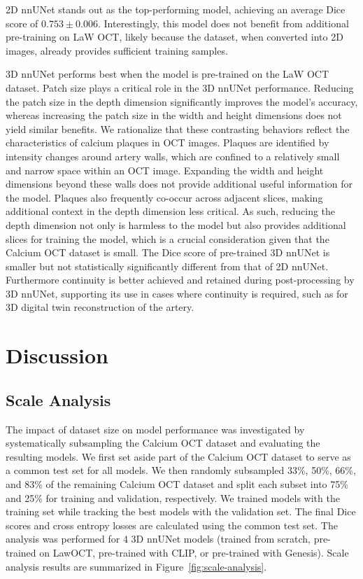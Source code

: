\documentclass[a4paper,11pt,oneside]{report}
\begin{document}
2D nnUNet stands out as the top-performing model, achieving an average Dice score of $0.753 \pm 0.006$. Interestingly, this model does not benefit from additional pre-training on LaW OCT, likely because the dataset, when converted into 2D images, already provides sufficient training samples.

3D nnUNet performs best when the model is pre-trained on the LaW OCT dataset. Patch size plays a critical role in the 3D nnUNet performance. Reducing the patch size in the depth dimension significantly improves the model’s accuracy, whereas increasing the patch size in the width and height dimensions does not yield similar benefits. We rationalize that these contrasting behaviors reflect the characteristics of calcium plaques in OCT images. Plaques are identified by intensity changes around artery walls, which are confined to a relatively small and narrow space within an OCT image. Expanding the width and height dimensions beyond these walls does not provide additional useful information for the model. Plaques also frequently co-occur across adjacent slices, making additional context in the depth dimension less critical. As such, reducing the depth dimension not only is harmless to the model but also provides additional slices for training the model, which is a crucial consideration given that the Calcium OCT dataset is small. The Dice score of pre-trained 3D nnUNet is smaller but not statistically significantly different from that of 2D nnUNet. Furthermore continuity is better achieved and retained during post-processing by 3D nnUNet, supporting its use in cases where continuity is required, such as for 3D digital twin reconstruction of the artery. %

\section{Discussion}
\subsection{Scale Analysis}
The impact of dataset size on model performance was investigated by systematically subsampling the Calcium OCT dataset and evaluating the resulting models. We first set aside part of the Calcium OCT dataset to serve as a common test set for all models. We then randomly subsampled 33\%, 50\%, 66\%, and 83\% of the remaining Calcium OCT dataset and split each subset into 75\% and 25\% for training and validation, respectively. We trained models with the training set while tracking the best models with the validation set. The final Dice scores and cross entropy losses are calculated using the common test set. The analysis was performed for 4 3D nnUNet models (trained from scratch, pre-trained on LawOCT, pre-trained with CLIP, or pre-trained with Genesis). Scale analysis results are summarized in Figure~\ref{fig:scale-analysis}. 
\end{document}
